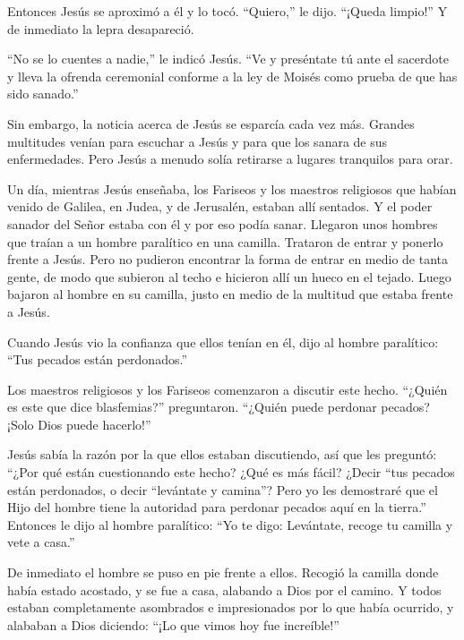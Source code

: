  Entonces Jesús se aproximó a él y lo tocó. ``Quiero,'' le
dijo. ``¡Queda limpio!'' Y de inmediato la lepra desapareció.

 ``No se lo cuentes a nadie,'' le indicó Jesús. ``Ve y
preséntate tú ante el sacerdote y lleva la ofrenda ceremonial conforme a
la ley de Moisés como prueba de que has sido sanado.''

 Sin embargo, la noticia acerca de Jesús se esparcía cada
vez más. Grandes multitudes venían para escuchar a Jesús y para que los
sanara de sus enfermedades.  Pero Jesús a menudo solía
retirarse a lugares tranquilos para orar.

 Un día, mientras Jesús enseñaba, los Fariseos y los
maestros religiosos que habían venido de Galilea, en Judea, y de
Jerusalén, estaban allí sentados. Y el poder sanador del Señor estaba
con él y por eso podía sanar.  Llegaron unos hombres que
traían a un hombre paralítico en una camilla. Trataron de entrar y
ponerlo frente a Jesús.  Pero no pudieron encontrar la
forma de entrar en medio de tanta gente, de modo que subieron al techo e
hicieron allí un hueco en el tejado. Luego bajaron al hombre en su
camilla, justo en medio de la multitud que estaba frente a Jesús.

 Cuando Jesús vio la confianza que ellos tenían en él, dijo
al hombre paralítico: ``Tus pecados están perdonados.''

 Los maestros religiosos y los Fariseos comenzaron a
discutir este hecho. ``¿Quién es este que dice blasfemias?''
preguntaron. ``¿Quién puede perdonar pecados? ¡Solo Dios puede
hacerlo!''

 Jesús sabía la razón por la que ellos estaban discutiendo,
así que les preguntó: ``¿Por qué están cuestionando este hecho?
 ¿Qué es más fácil? ¿Decir ``tus pecados están perdonados,
o decir ``levántate y camina''?  Pero yo les demostraré que
el Hijo del hombre tiene la autoridad para perdonar pecados aquí en la
tierra.'' Entonces le dijo al hombre paralítico: ``Yo te digo:
Levántate, recoge tu camilla y vete a casa.''

 De inmediato el hombre se puso en pie frente a ellos.
Recogió la camilla donde había estado acostado, y se fue a casa,
alabando a Dios por el camino.  Y todos estaban
completamente asombrados e impresionados por lo que había ocurrido, y
alababan a Dios diciendo: ``¡Lo que vimos hoy fue increíble!''

